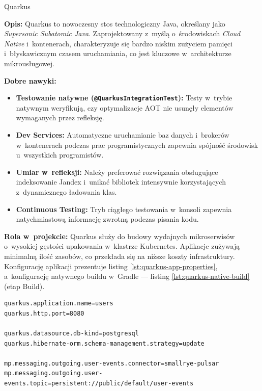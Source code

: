 \begin{techcard}{Quarkus}

\textbf{Opis:} Quarkus to nowoczesny stos technologiczny Java, określany jako \textit{Supersonic Subatomic Java}. Zaprojektowany z~myślą o~środowiskach \textit{Cloud Native} i~kontenerach, charakteryzuje się bardzo niskim zużyciem pamięci i~błyskawicznym czasem uruchamiania, co jest kluczowe w~architekturze mikrousługowej.

\textbf{Dobre nawyki:}
\begin{itemize}
  \item \textbf{Testowanie natywne (\texttt{@QuarkusIntegrationTest}):} Testy w~trybie natywnym weryfikują, czy optymalizacje AOT nie usunęły elementów wymaganych przez refleksję.
  \item \textbf{Dev Services:} Automatyczne uruchamianie baz danych i~brokerów w~kontenerach podczas prac programistycznych zapewnia spójność środowisk u~wszystkich programistów.
  \item \textbf{Umiar w~refleksji:} Należy preferować rozwiązania obsługujące indeksowanie Jandex i~unikać bibliotek intensywnie korzystających z~dynamicznego ładowania klas.
  \item \textbf{Continuous Testing:} Tryb ciągłego testowania w~konsoli zapewnia natychmiastową informację zwrotną podczas pisania kodu.
\end{itemize}

\textbf{Rola w~projekcie:} Quarkus służy do budowy wydajnych mikroserwisów o~wysokiej gęstości upakowania w~klastrze Kubernetes. Aplikacje zużywają minimalną ilość zasobów, co przekłada się na niższe koszty infrastruktury. Konfigurację aplikacji prezentuje listing \ref{lst:quarkus-app-properties}, a~konfigurację natywnego buildu w~Gradle --- listing \ref{lst:quarkus-native-build} (etap Build).

\end{techcard}

\begin{lstlisting}[caption={Fragment konfiguracji aplikacji (apps/users/src/main/resources/application.properties)}, label={lst:quarkus-app-properties}]
quarkus.application.name=users
quarkus.http.port=8080

quarkus.datasource.db-kind=postgresql
quarkus.hibernate-orm.schema-management.strategy=update

mp.messaging.outgoing.user-events.connector=smallrye-pulsar
mp.messaging.outgoing.user-events.topic=persistent://public/default/user-events
\end{lstlisting}

